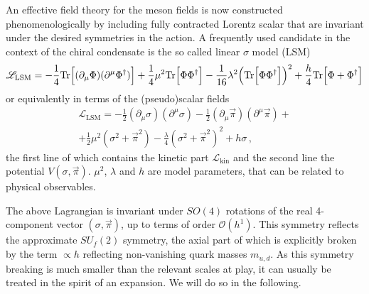 An effective field theory for the meson fields is now constructed phenomenologically by including fully contracted Lorentz scalar that are invariant under the desired symmetries in the action. A frequently used candidate in the context of the chiral condensate is the so called linear $\sigma$ model (LSM)
\begin{equation}
    \mathscr{L}_{\text{LSM}}=-\frac{1}{4}{\text{Tr}}\Big[(\partial_\mu\Phi)(\partial^\mu\Phi^\dagger)\Big]+\frac{1}{4}\mu^2{\text{Tr}}\Big[\Phi\Phi^\dagger\Big]-\frac{1}{16}\lambda^2\Big({\text{Tr}}\Big[\Phi\Phi^\dagger\Big]\Big)^2+\frac{h}{4}{\text{Tr}}\Big[\Phi+\Phi^\dagger\Big]
\end{equation}
or equivalently in terms of the (pseudo)scalar fields
\begin{multline}
    \mathscr{L}_{\text{LSM}}=-\frac{1}{2}(\partial_\mu\sigma)(\partial^\mu\sigma)-\frac{1}{2}(\partial_\mu\vec{\pi})(\partial^\mu\vec{\pi})+\\
    +\frac{1}{2}\mu^2(\sigma^2+\vec{\pi}^2)-\frac{\lambda}{4}(\sigma^2+\vec{\pi}^2)^2+h\sigma\,,
    \label{eq:LinearSigmaModelLagrangian}
\end{multline}
the first line of which contains the kinetic part $\mathscr{L}_{\text{kin}}$ and the second line the potential $V(\sigma,\vec{\pi})$. $\mu^2$, $\lambda$ and $h$ are model parameters, that can be related to physical observables.

The above Lagrangian is invariant under $SO(4)$ rotations of the real 4-component vector ${(\sigma,\vec{\pi})}$, up to terms of order ${\mathcal{O}(h^1)}$. This symmetry reflects the approximate $SU_f(2)$ symmetry, the axial part of which is explicitly broken by the term $\propto h$ reflecting non-vanishing quark masses $m_{u,d}$. As this symmetry breaking is much smaller than the relevant scales at play, it can usually be treated in the spirit of an expansion. We will do so in the following.

